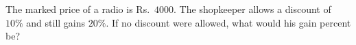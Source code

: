 The marked price of a radio is Rs.~$4000$. The shopkeeper allows a discount of $10\%$ and still gains $20\%$. If no discount were allowed, what would his gain percent be?
